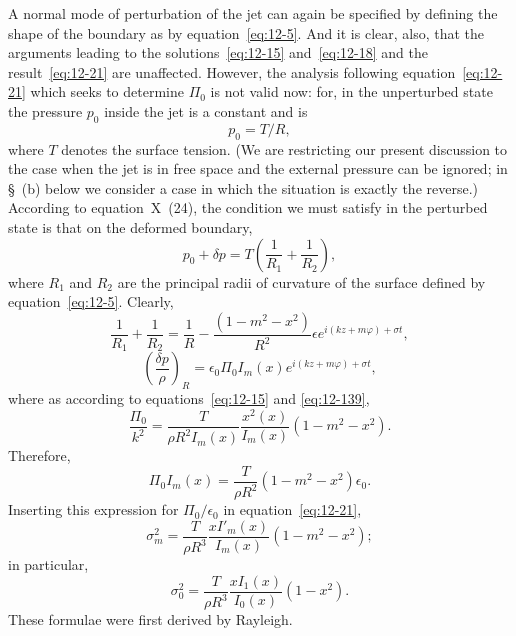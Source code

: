 A normal mode of perturbation of the jet can again be specified by defining the shape of the boundary as by equation~\eqref{eq:12-5}. And it is clear, also, that the arguments leading to the solutions~\eqref{eq:12-15} and~\eqref{eq:12-18} and the result~\eqref{eq:12-21} are unaffected. However, the analysis following equation~\eqref{eq:12-21} which seeks to determine $\Pi_0$ is not valid now: for, in the unperturbed state the pressure $p_0$ inside the jet is a constant and is
\begin{equation}
\label{eq:12-140}
p_0 = T/R,
\end{equation}
where $T$ denotes the surface tension. (We are restricting our present discussion to the case when the jet is in free space and the external pressure can be ignored; in \S~(b) below we consider a case in which the situation is exactly the reverse.) According to equation~X~(24), the condition we must satisfy in the perturbed state is that on the deformed boundary,
\begin{equation}
\label{eq:12-141}
p_0 + \delta p = T\left(\frac{1}{R_1} + \frac{1}{R_2}\right),
\end{equation}
where $R_1$ and $R_2$ are the principal radii of curvature of the surface defined by equation~\eqref{eq:12-5}. Clearly,
\begin{equation}
\label{eq:12-142}
\frac{1}{R_1} + \frac{1}{R_2} = \frac{1}{R} - \frac{(1-m^2-x^2)}{R^2}\epsilon e^{i(kz+m\varphi)+\sigma t},
\end{equation}
\begin{equation}
\label{eq:12-143}
\left(\frac{\delta p}{\rho}\right)_R = \epsilon_0 \Pi_0 I_m(x) e^{i(kz+m\varphi)+\sigma t},
\end{equation}
where as according to equations~\eqref{eq:12-15} and \eqref{eq:12-139},
\begin{equation}
\label{eq:12-144}
\frac{\Pi_0}{k^2} = \frac{T}{\rho R^2 I_m(x)} \frac{x^2(x)}{I_m(x)} (1-m^2-x^2).
\end{equation}
Therefore,
\begin{equation}
\label{eq:12-145}
\Pi_0 I_m(x) = \frac{T}{\rho R^2}(1-m^2-x^2) \epsilon_0.
\end{equation}
Inserting this expression for $\Pi_0/\epsilon_0$ in equation~\eqref{eq:12-21},
\begin{equation}
\label{eq:12-146}
\sigma_m^2 = \frac{T}{\rho R^3}\frac{x I'_m(x)}{I_m(x)}(1-m^2-x^2);
\end{equation}
in particular,
\begin{equation}
\label{eq:12-147}
\sigma_0^2 = \frac{T}{\rho R^3}\frac{xI_1(x)}{I_0(x)}(1-x^2).
\end{equation}
These formulae were first derived by Rayleigh.

